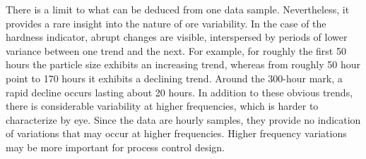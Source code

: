 There is a limit to what can be deduced from one data sample. Nevertheless, it provides a rare insight into the nature of ore variability. In the case of the hardness indicator, abrupt changes are visible, interspersed by periods of lower variance between one trend and the next. For example, for roughly the first 50 hours the particle size exhibits an increasing trend, whereas from roughly 50 hour point to 170 hours it exhibits a declining trend. Around the 300-hour mark, a rapid decline occurs lasting about 20 hours. In addition to these obvious trends, there is considerable variability at higher frequencies, which is harder to characterize by eye. Since the data are hourly samples, they provide no indication of variations that may occur at higher frequencies. Higher frequency variations may be more important for process control design.

